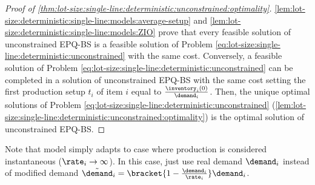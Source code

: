 \begin{proof}[Proof of \cref{thm:lot-size:single-line:deterministic:unconstrained:optimality}]
\cref{lem:lot-size:deterministic:single-line:models:average-setup} and \cref{lem:lot-size:deterministic:single-line:models:ZIO} prove that every feasible solution of unconstrained EPQ-BS is a feasible solution of Problem \ref{eq:lot-size:single-line:deterministic:unconstrained} with the same cost.
Conversely, a feasible solution of Problem \ref{eq:lot-size:single-line:deterministic:unconstrained} can be completed in a solution of unconstrained EPQ-BS with the same cost setting the first production setup $t_i$ of item $i$ equal to $\frac{\inventory_i(0)}{\demand_i}$.
Then, the unique optimal solutions of Problem \ref{eq:lot-size:single-line:deterministic:unconstrained} (\cref{lem:lot-size:single-line:deterministic:unconstrained:optimality}) is the optimal solution of unconstrained EPQ-BS.
\end{proof}


\medskip


Note that model simply adapts to case where production is considered instantaneous (\ie $\rate_i\rightarrow\infty$).
In this case, just use real demand $\demand_i$ instead of modified demand $\tilde{\demand}_i=\bracket{1-\frac{\demand_i}{\rate_i}}\demand_i$.










